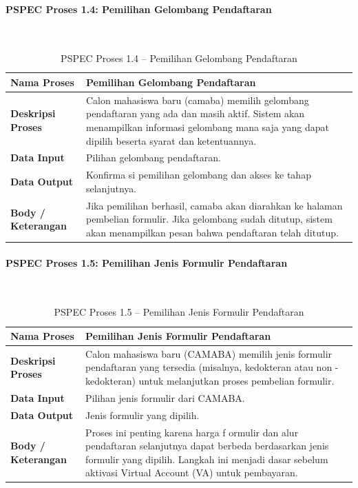 

\paragraph{PSPEC Proses 1.4: Pemilihan Gelombang Pendaftaran}~\\
\begin{longtable}{|p{}|p{}|}
	\caption{PSPEC Proses 1.4 -- Pemilihan Gelombang Pendaftaran}
	\label{table:3.pspec14}\\
	\hline
	\textbf{Nama Proses} & Pemilihan Gelombang Pendaftaran \\
	\hline
	\textbf{Deskripsi Proses} & Calon mahasiswa baru (camaba) memilih gelombang pendaftaran yang ada dan masih aktif. Sistem akan menampilkan informasi gelombang mana saja yang dapat dipilih beserta syarat dan ketentuannya. \\
	\hline
	\textbf{Data Input} & Pilihan gelombang pendaftaran. \\
	\hline
	\textbf{Data Output} & Konfirma si pemilihan gelombang dan akses ke tahap selanjutnya. \\
	\hline
	\textbf{Body / Keterangan} & Jika pemilihan berhasil, camaba akan diarahkan ke halaman pembelian formulir. Jika gelombang sudah ditutup, sistem akan menampilkan pesan bahwa pendaftaran telah ditutup. \\
	\hline
\end{longtable}


\paragraph{PSPEC Proses 1.5: Pemilihan Jenis Formulir Pendaftaran}~\\
\begin{longtable}{|p{}|p{}|}
	\caption{PSPEC Proses 1.5 -- Pemilihan Jenis Formulir Pendaftaran}
	\label{table:3.pspec15}\\
	\hline
	\textbf{Nama Proses} & Pemilihan Jenis Formulir Pendaftaran \\
	\hline
	\textbf{Deskripsi Proses} & Calon mahasiswa baru (CAMABA) memilih jenis formulir pendaftaran yang tersedia (misalnya, kedokteran atau non - kedokteran) untuk melanjutkan proses pembelian formulir. \\
	\hline
	\textbf{Data Input} & Pilihan jenis formulir dari CAMABA. \\
	\hline
	\textbf{Data Output} & Jenis formulir yang dipilih. \\
	\hline
	\textbf{Body / Keterangan} & Proses ini penting karena harga f ormulir dan alur pendaftaran selanjutnya dapat berbeda berdasarkan jenis formulir yang dipilih. Langkah ini menjadi dasar sebelum aktivasi Virtual Account (VA) untuk pembayaran. \\
	\hline
\end{longtable}


